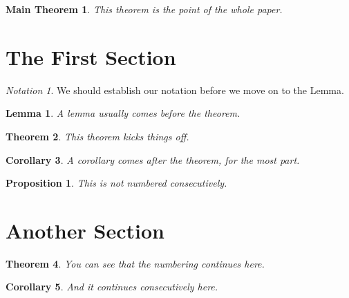 \documentclass{article}
\theoremstyle{plain}
\newtheorem{theorem}{Theorem}[section]
\newtheorem{corollary}[theorem]{Corollary}
\newtheorem{lemma}[theorem]{Lemma}
\newtheorem*{main}{Main Theorem}
\newtheorem{proposition}{Proposition}
\theoremstyle{definition}
\theoremstyle{remark}
\newtheorem*{notation}{Notation}
\begin{document}
\begin{main}
This theorem is the point of the whole paper.
\end{main}

\section{The First Section}

\begin{notation}
We should establish our notation before we move on to the Lemma.
\end{notation}

\begin{lemma}
A lemma usually comes before the theorem.
\end{lemma}

\begin{theorem}
This theorem kicks things off.
\end{theorem}

\begin{corollary}
A corollary comes after the theorem, for the most part.
\end{corollary}

\begin{proposition}
This is not numbered consecutively.
\end{proposition}

\section{Another Section}

\begin{theorem}
You can see that the numbering continues here.
\end{theorem}

\begin{corollary}
And it continues consecutively here.
\end{corollary}
\end{document}
